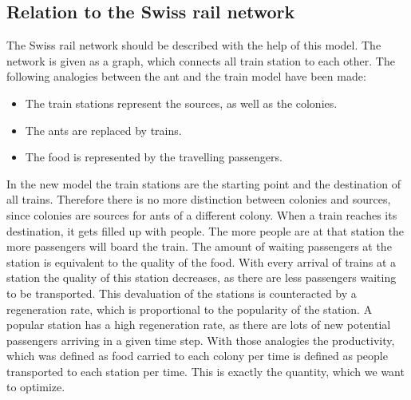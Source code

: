 \subsection{Relation to the Swiss rail network}\label{relationNetwork}
The Swiss rail network should be described with the help of this model. The network is given as a graph, which connects all train station to each other. The following analogies between the ant and the train model have been made:
\begin{itemize}
  \item The train stations represent the sources, as well as the colonies.
  \item The ants are replaced by trains.
  \item The food is represented by the travelling passengers.
\end{itemize}
 In the new model the train stations are the starting point and the destination of all trains. Therefore there is no more distinction between colonies and sources, since colonies are sources for ants of a different colony. When a train reaches its destination, it gets filled up with people. The more people are at that station the more passengers will board the train. The amount of waiting passengers at the station is equivalent to the quality of the food. With every arrival of trains at a station the quality of this station decreases, as there are less passengers waiting to be transported. This devaluation of the stations is counteracted by a regeneration rate, which is proportional to the popularity of the station. A popular station has a high regeneration rate, as there are lots of new potential passengers arriving in a given time step. With those analogies the productivity, which was defined as food carried to each colony per time is defined as people transported to each station per time. This is exactly the quantity, which we want to optimize.